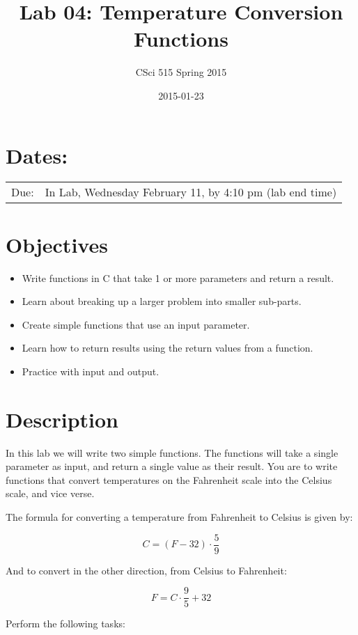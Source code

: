 \documentclass[11pt]{article}
\title{Lab 04: Temperature Conversion Functions}
\author{CSci 515 Spring 2015}
\date{2015-01-23}
\begin{document}
\maketitle


\section*{Dates:}
\label{sec-1}


\begin{center}
\begin{tabular}{ll}
 Due:  &  In Lab, Wednesday February 11, by 4:10 pm (lab end time)  \\
\end{tabular}
\end{center}
\section*{Objectives}
\label{sec-2}

\begin{itemize}
\item Write functions in C that take 1 or more parameters and return a result.
\item Learn about breaking up a larger problem into smaller sub-parts.
\item Create simple functions that use an input parameter.
\item Learn how to return results using the return values from a function.
\item Practice with input and output.
\end{itemize}
\section*{Description}
\label{sec-3}

In this lab we will write two simple functions.  The functions will
take a single parameter as input, and return a single value as their
result.  You are to write functions that convert temperatures
on the Fahrenheit scale into the Celsius scale, and vice verse.

The formula for converting a temperature from Fahrenheit to Celsius is
given by:

$$
C = (F - 32) \cdot \frac{5}{9}
$$

And to convert in the other direction, from Celsius to Fahrenheit:

$$
F = C \cdot \frac{9}{5} + 32
$$

Perform the following tasks:
\end{document}
